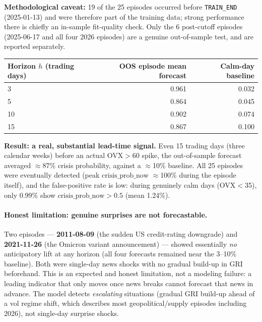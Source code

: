 \documentclass[11pt]{article}
\begin{document}
\textbf{Methodological caveat:} 19 of the 25 episodes occurred before
\texttt{TRAIN\_END} (2025-01-13) and were therefore part of the training
data; strong performance there is chiefly an in-sample fit-quality check.
Only the 6 post-cutoff episodes (2025-06-17 and all four 2026 episodes) are
a genuine out-of-sample test, and are reported separately.

\begin{center}
\begin{tabular}{lrr}
\toprule
Horizon $h$ (trading days) & OOS episode mean forecast & Calm-day baseline \\
\midrule
3  & 0.961 & 0.032 \\
5  & 0.864 & 0.045 \\
10 & 0.902 & 0.074 \\
15 & 0.867 & 0.100 \\
\bottomrule
\end{tabular}
\end{center}

\textbf{Result: a real, substantial lead-time signal.} Even 15 trading days
(three calendar weeks) before an actual OVX$>$60 spike, the out-of-sample
forecast averaged $\approx$87\% crisis probability, against a $\approx$10\%
baseline. All 25 episodes were eventually detected (peak
$\text{crisis\_prob\_now}$ $\approx$100\% during the episode itself), and
the false-positive rate is low: during genuinely calm days (OVX$<$35),
only 0.99\% show $\text{crisis\_prob\_now} > 0.5$ (mean 1.24\%).

\paragraph{Honest limitation: genuine surprises are not forecastable.} Two
episodes --- \textbf{2011-08-09} (the sudden US credit-rating downgrade)
and \textbf{2021-11-26} (the Omicron variant announcement) --- showed
essentially \emph{no} anticipatory lift at any horizon (all four forecasts
remained near the 3--10\% baseline). Both were single-day news shocks with
no gradual build-up in GRI beforehand. This is an expected and honest
limitation, not a modeling failure: a leading indicator that only moves
once news breaks cannot forecast that news in advance. The model detects
\emph{escalating} situations (gradual GRI build-up ahead of a vol regime
shift, which describes most geopolitical/supply episodes including 2026),
not single-day surprise shocks.
\end{document}
